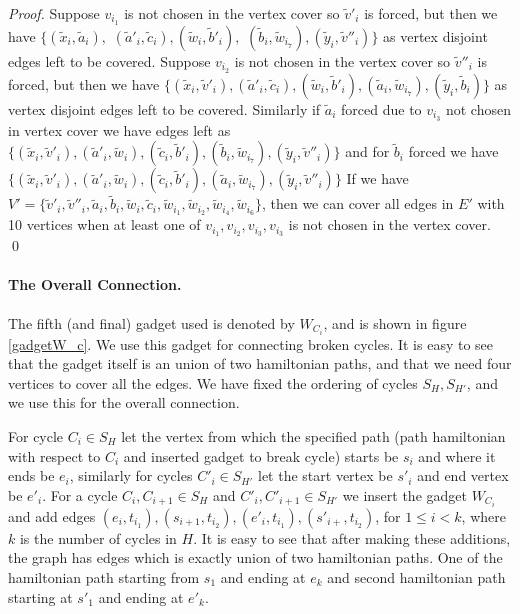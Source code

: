 \documentclass[svgnames]{llncs}
\begin{document}
{\begin{proof}
Suppose $v_{i_1}$ is not chosen in the vertex cover so $\tilde{v}'_i$ is forced, but then we have
$\{(\tilde{x}_i,\tilde{a}_i),$ $(\tilde{a}'_i,\tilde{c}_i),(\tilde{w}_i,\tilde{b}'_i),$ $(\tilde{b}_i,\tilde{w}_{i_7}),(\tilde{y}_i,\tilde{v}''_i)\}$
as vertex disjoint edges left to be covered.
Suppose $v_{i_2}$ is not chosen in the vertex cover so $\tilde{v}''_i$ is forced, but then we have
$\{(\tilde{x}_i,\tilde{v}'_i),(\tilde{a}'_i,\tilde{c}_i),(\tilde{w}_i,\tilde{b}'_i),(\tilde{a}_i,\tilde{w}_{i_7}),(\tilde{y}_i,\tilde{b}_i)\}$
as vertex disjoint edges left to be covered.
Similarly if $\tilde{a}_i$ forced due to $v_{i_3}$ not chosen in vertex cover we have edges left as
$\{(\tilde{x}_i,\tilde{v}'_i),(\tilde{a}'_i,\tilde{w}_i),(\tilde{c}_i,\tilde{b}'_i),(\tilde{b}_i,\tilde{w}_{i_7}),(\tilde{y}_i,\tilde{v}''_i)\}$
and for $\tilde{b}_i$ forced we have
$\{(\tilde{x}_i,\tilde{v}'_i),(\tilde{a}'_i,\tilde{w}_i),(\tilde{c}_i,\tilde{b}'_i),(\tilde{a}_i,\tilde{w}_{i_7}),(\tilde{y}_i,\tilde{v}''_i)\}$
If we have
$V'=\{\tilde{v}'_i,\tilde{v}''_i,\tilde{a}_i,\tilde{b}_i,\tilde{w}_i,\tilde{c}_i,\tilde{w}_{i_1},\tilde{w}_{i_2},\tilde{w}_{i_4},\tilde{w}_{i_6}\}$, then we can cover all edges in $E'$ with 10 vertices when at least one of $v_{i_1},v_{i_2},v_{i_3},v_{i_3}$ is not chosen in the vertex cover.
\qed
\end{proof}

\paragraph{The Overall Connection.} The fifth (and final) gadget used is denoted by $W_{C_i}$, and is shown in figure \ref{gadgetW_c}. We use this gadget for connecting broken cycles. It is easy to see that the gadget itself is an union of two hamiltonian paths, and that we need four vertices to cover all the edges. We have fixed the ordering of cycles $S_H,S_{H'}$, and we use this for the overall connection.

For cycle $C_i \in S_H$ let the vertex from which the specified path (path hamiltonian with respect to $C_i$ and inserted gadget to break cycle) starts be $s_i$ and where it ends be $e_i$,
similarly for cycles $C'_i \in S_{H'}$ let the start vertex be $s'_i$ and end vertex be $e'_i$.
For a cycle $C_i,C_{i+1} \in S_H$ and $C'_i,C'_{i+1} \in S_{H'}$ we insert the gadget $W_{C_i}$ and add edges $(e_i,t_{i_1}),(s_{i+1},t_{i_2}),(e'_i,t_{i_1}),(s'_{i+},t_{i_2})$,
for $ 1 \leq i < k $, where $k$ is the number of cycles in $H$. It is easy to see that after making these additions, the graph has edges which is exactly union of two hamiltonian paths. One of the hamiltonian path starting from $s_1$ and ending at $e_k$ and second hamiltonian path starting at $s'_1$ and ending at $e'_k$.

}
\end{document}
